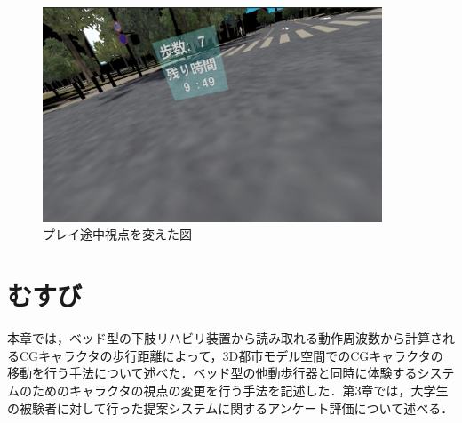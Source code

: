\begin{figure}[tbp]
	\centering
			\includegraphics[width=0.9\textwidth]{chap2-figure/midstream-2.eps}
	\caption{プレイ途中視点を変えた図}
	\label{fig:geammidstream}
\end{figure}

\section{むすび}
本章では，ベッド型の下肢リハビリ装置から読み取れる動作周波数から計算されるCGキャラクタの歩行距離によって，3D都市モデル空間でのCGキャラクタの移動を行う手法について述べた．ベッド型の他動歩行器と同時に体験するシステムのためのキャラクタの視点の変更を行う手法を記述した．第3章では，大学生の被験者に対して行った提案システムに関するアンケート評価について述べる．
